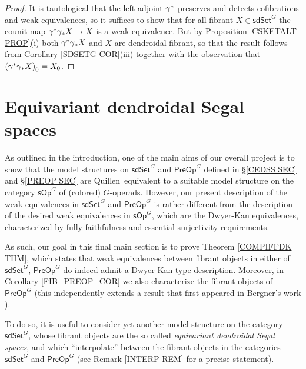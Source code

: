 \documentclass[a4paper,10pt
 ,draft
]{article}%
\begin{document}
\begin{proof}
	It is tautological that the left adjoint $\gamma^{\**}$
	preserves and detects cofibrations and weak equivalences,
	so it suffices to show that for all fibrant
	$X \in \mathsf{sdSet}^G$
	the counit map 
	$\gamma^{\**} \gamma_{\**} X \to X$
	is a weak equivalence. 
	But by
	Proposition \ref{CSKETALT PROP}(i) both
	$\gamma^{\**} \gamma_{\**} X$ and $X$
	are dendroidal fibrant, 
	so that the result follows from 
	Corollary \ref{SDSETG COR}(iii) together with the observation that $\left(\gamma^{\**} \gamma_{\**} X\right)_0 = X_0$.
\end{proof}



\section{Equivariant dendroidal Segal spaces}
\label{EDSS_SEC}

As outlined in the introduction, one of the main aims of our overall project is to show that the model structures on 
$\mathsf{sdSet}^G$ and $\mathsf{PreOp}^G$
defined in \S \ref{CEDSS SEC} and \S \ref{PREOP SEC}
are Quillen\ equivalent to a suitable model structure on the category 
$\mathsf{sOp}^G$ of (colored) $G$-operads.
However, our present description of the weak equivalences in 
$\mathsf{sdSet}^G$ and $\mathsf{PreOp}^G$
is rather different from the description of the desired weak equivalences in $\mathsf{sOp}^G$,
which are the Dwyer-Kan equivalences, 
characterized by fully faithfulness and essential surjectivity requirements.

As such, our goal in this final main section is to prove
Theorem \ref{COMPIFFDK THM},
which states that weak equivalences between fibrant objects in either of 
$\mathsf{sdSet}^G$, $\mathsf{PreOp}^G$
do indeed admit a Dwyer-Kan type description.
Moreover, in Corollary \ref{FIB_PREOP_COR} we also characterize the fibrant objects
of $\mathsf{PreOp}^G$
(this independently extends a result that first appeared in Bergner's work \cite{Ber07}).

To do so, it is useful to consider yet another model structure on the category $\mathsf{sdSet}^G$,
whose fibrant objects are the so called
\textit{equivariant dendroidal Segal spaces},
and which ``interpolate''
between the fibrant objects 
in the categories $\mathsf{sdSet}^G$ and $\mathsf{PreOp}^G$ (see Remark \ref{INTERP REM} for a precise statement).
\end{document}
